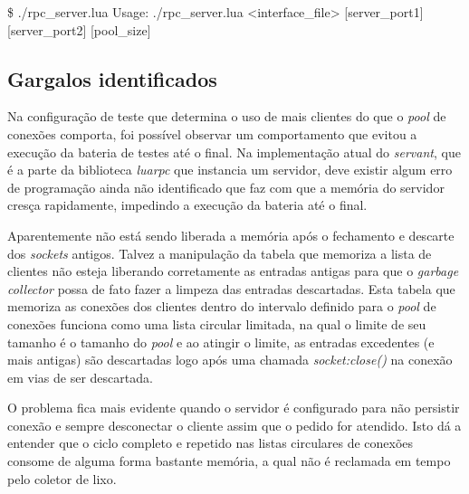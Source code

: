 \documentclass[11pt]{article}
\begin{document}
\$ ./rpc\_server.lua
Usage: ./rpc\_server.lua <interface\_file> [server\_port1] [server\_port2]
[pool\_size]

\subsection{Gargalos identificados}\label{subsec:bottle}

Na configuração de teste que determina o uso de mais clientes do que o
\textit{pool} de conexões comporta, foi possível observar um comportamento que
evitou a execução da bateria de testes até o final. Na implementação atual do
\textit{servant}, que é a parte da biblioteca \textit{luarpc} que instancia
um servidor, deve existir algum erro de programação ainda não identificado que
faz com que a memória do servidor cresça rapidamente, impedindo a execução da
bateria até o final.

Aparentemente não está sendo liberada a memória após o
fechamento e descarte dos \textit{sockets} antigos. Talvez a manipulação da
tabela que memoriza a lista de clientes não esteja liberando corretamente as
entradas antigas para que o \textit{garbage collector} possa de fato fazer a
limpeza das entradas descartadas. Esta tabela que memoriza as conexões dos
clientes dentro do intervalo definido para o \textit{pool} de conexões funciona
como uma lista circular limitada, na qual o limite de seu tamanho é o tamanho do
\textit{pool} e ao atingir o limite, as entradas excedentes (e mais antigas) são
descartadas logo após uma chamada \textit{socket:close()} na conexão em vias de
ser descartada.

O problema fica mais evidente quando o servidor é configurado para não persistir
conexão e sempre desconectar o cliente assim que o pedido for atendido. Isto dá
a entender que o ciclo completo e repetido nas listas circulares de conexões
consome de alguma forma bastante memória, a qual não é reclamada em tempo pelo
coletor de lixo.
\end{document}

